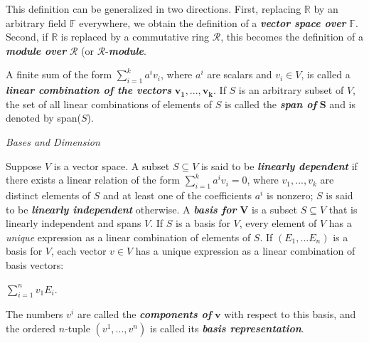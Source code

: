 \documentclass[12pt, a4paper]{article}
\begin{document}
\vspace{4mm}

This definition can be generalized in two directions. First, replacing $\mathbb{R}$ by an arbitrary field $\mathbb{F}$ everywhere, we obtain the definition of a \textit{\textbf{vector space over}} $\mathbb{F}$. Second, if $\mathbb{R}$ is replaced by a commutative ring $\mathcal{R}$, this becomes the definition of a \textit{\textbf{module over}} $\mathcal{R}$ (or $\mathcal{R}$-\textit{\textbf{module}}.\par

A finite sum of the form $\sum_{i=1}^{k} a^iv_i$, where $a^i$ are scalars and $v_i\in V$, is called a \textit{\textbf{linear combination of the vectors }}$\bm{v_1, ... , v_k}$. If $S$ is an arbitrary subset of $V$, the set of all linear combinations of elements of $S$ is called the \textit{\textbf{span of }}$\bm{S}$ and is denoted by span($S$).\par

\vspace{4mm}

\begin{flushleft}
\textit{\large{Bases and Dimension}}
\end{flushleft}



Suppose $V$ is a vector space. A subset $S\subseteq V$ is said to be \textit{\textbf{linearly dependent}} if there exists a linear relation of the form $\sum_{i=1}^{k} a^iv_i=0$, where $v_1, ... , v_k$ are distinct elements of $S$ and at least one of the coefficients $a^i$ is nonzero; $S$ is said to be \textit{\textbf{linearly independent}} otherwise. A \textit{\textbf{basis for }}$\bm{V}$ is a subset $S\subseteq V$ that is linearly independent and spans $V$. If $S$ is a basis for $V$, every element of $V$ has a \textit{unique} expression as a linear combination of elements of $S$. If $(E_1, ... E_n)$ is a basis for $V$, each vector $v\in V$ has a unique expression as a linear combination of basis vectors:\par

\vspace{4mm}

\centerline{\large{$\sum\limits_{i=1}^{n} v_1E_i$}.}

\newpage

The numbers $v^i$ are called the \textit{\textbf{components of}} $\bm{v}$ with respect to this basis, and the ordered $n$-tuple $(v^1, ... , v^n)$ is called its \textit{\textbf{basis representation}}.
\end{document}

